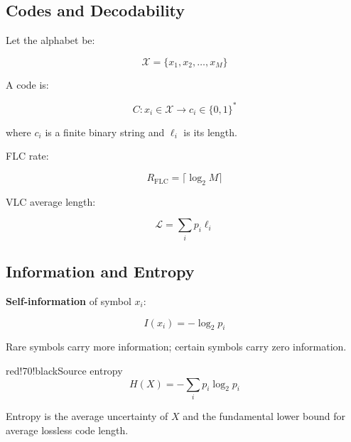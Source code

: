 \subsection{Codes and Decodability}

Let the alphabet be:

\[
\mathcal{X}=\{x_1,x_2,\ldots,x_M\}
\]

A code is:

\[
C:x_i\in\mathcal{X}\rightarrow c_i\in\{0,1\}^*
\]

where $c_i$ is a finite binary string and $\ell_i$ is its length.

\begin{center}
\end{center}

FLC rate:

\[
R_{\mathrm{FLC}}=\lceil\log_2 M\rceil
\]

VLC average length:

\[
\mathcal{L}=\sum_i p_i\ell_i
\]

\subsection{Information and Entropy}

\textbf{Self-information} of symbol $x_i$:

\[
I(x_i)=-\log_2 p_i
\]

Rare symbols carry more information; certain symbols carry zero information.

\begin{calloutbox}{red!70!black}{Source entropy}
\[
H(X)=-\sum_i p_i\log_2 p_i
\]

Entropy is the average uncertainty of $X$ and the fundamental lower bound for average lossless code length.
\end{calloutbox}

